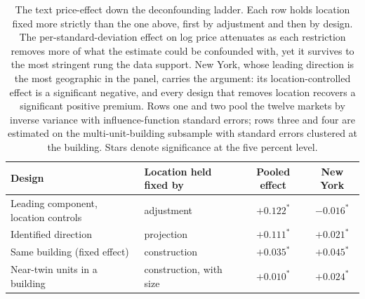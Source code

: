 \begin{table}[H]
\centering
\caption{The text price-effect down the deconfounding ladder. Each row holds
location fixed more strictly than the one above, first by adjustment and then by
design. The per-standard-deviation effect on log price attenuates as each
restriction removes more of what the estimate could be confounded with, yet it
survives to the most stringent rung the data support. New York, whose leading
direction is the most geographic in the panel, carries the argument: its
location-controlled effect is a significant negative, and every design that removes
location recovers a significant positive premium. Rows one and two pool the twelve markets by
inverse variance with influence-function standard errors; rows three and four are
estimated on the multi-unit-building subsample with standard errors clustered at the
building. Stars denote significance at the five percent level.}
\label{tab:ladder}
\begin{tabular}{llcc}
\toprule
Design & Location held fixed by & Pooled effect & New York \\
\midrule
Leading component, location controls & adjustment & $+0.122^{*}$ & $-0.016^{*}$ \\
Identified direction & projection & $+0.111^{*}$ & $+0.021^{*}$ \\
Same building (fixed effect) & construction & $+0.035^{*}$ & $+0.045^{*}$ \\
Near-twin units in a building & construction, with size & $+0.010^{*}$ & $+0.024^{*}$ \\
\bottomrule
\end{tabular}
\end{table}
